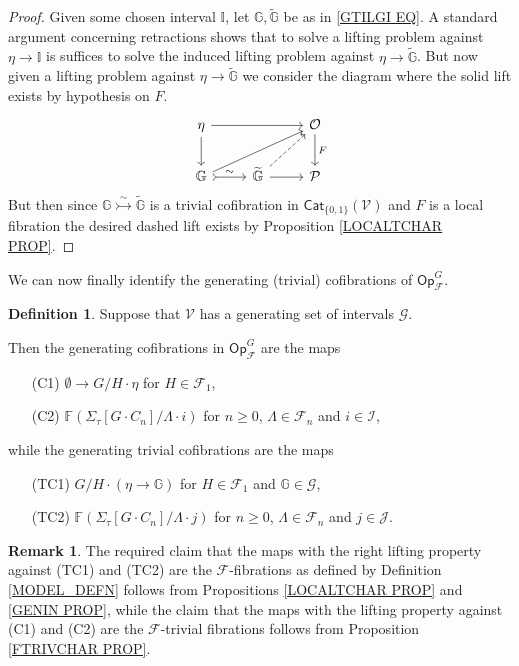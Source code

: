 \documentclass[a4paper,10pt
,draft
]{article}%
\numberwithin{equation}{section}
\numberwithin{figure}{section}
\theoremstyle{definition} %
\newtheorem{definition}[equation]{Definition}%
\newtheorem{remark}[equation]{Remark}%
\newcommand{\F}{\ensuremath{\mathcal F}}
\newcommand{\V}{\ensuremath{\mathcal V}}
\renewcommand{\O}{\ensuremath{\mathcal O}}
\renewcommand{\P}{\ensuremath{\mathcal P}}
\newcommand{\1}{\ensuremath{\mathbbm 1}}%
\begin{document}
\begin{proof}
Given some chosen interval $\mathbb{I}$,
let $\mathbb{G}, \widetilde{\mathbb{G}}$
be as in \eqref{GTILGI EQ}.
A standard argument concerning retractions shows that to solve a lifting problem against $\eta \to \mathbb{I}$
is suffices to solve the induced lifting problem against
$\eta \to \widetilde{\mathbb{G}}$.
But now given a lifting problem against 
$\eta \to \widetilde{\mathbb{G}}$
we consider the diagram where the solid lift exists by hypothesis on $F$.
\[
\begin{tikzcd}
	\eta \ar{d} \ar{rr}  
&&
	\O 	\ar{d}{F}
\\
	\mathbb{G} \ar[rightarrowtail]{r}{\sim} \ar{rru}
&
	\widetilde{\mathbb{G}} \ar{r} \ar[dashed]{ru}
&
	\P
\end{tikzcd}
\]
But then since $\mathbb{G} \overset{\sim}{\rightarrowtail} \widetilde{\mathbb{G}}$
is a trivial cofibration in $\mathsf{Cat}_{\{0,1\}}(\V)$
and $F$ is a local fibration
the desired dashed lift exists
by Proposition \ref{LOCALTCHAR PROP}.
\end{proof}


We can now finally identify the generating (trivial) cofibrations of
$\mathsf{Op}^G_{\F}$.


\begin{definition}\label{OPGENCOF DEF}
Suppose that $\V$ has a generating set of intervals $\mathscr{G}$.

Then the generating cofibrations in $\mathsf{Op}^G_{\F}$
are the maps
\begin{itemize}
\item[(C1)] $\emptyset \to G/H \cdot \eta$ for $H \in \F_1$,
\item[(C2)] $\mathbb{F} \left( \Sigma_{\tau}[G \cdot C_n]/\Lambda \cdot i\right)$
for $n \geq 0$, $\Lambda \in \F_n$ and $i \in \mathcal{I}$,
\end{itemize}
while the generating trivial cofibrations are the maps 
\begin{itemize}
\item[(TC1)] 
$G/H \cdot \left(\eta \to \mathbb{G}\right)$ for $H \in \F_1$ and $\mathbb{G} \in \mathscr{G}$,
\item[(TC2)] 
$\mathbb{F} \left( \Sigma_{\tau}[G \cdot C_n]/\Lambda \cdot j\right)$
for $n \geq 0$, $\Lambda \in \F_n$ and $j \in \mathcal{J}$.
\end{itemize}
\end{definition}


\begin{remark}
	The required claim that the maps with the right lifting property against (TC1) and (TC2) are the $\F$-fibrations as defined by
	Definition \ref{MODEL_DEFN} follows from 
	Propositions \ref{LOCALTCHAR PROP} and \ref{GENIN PROP},
	while the claim that the maps with the lifting property against (C1) and (C2) are the $\F$-trivial fibrations follows from
	Proposition \ref{FTRIVCHAR PROP}.
\end{remark}
\end{document}
